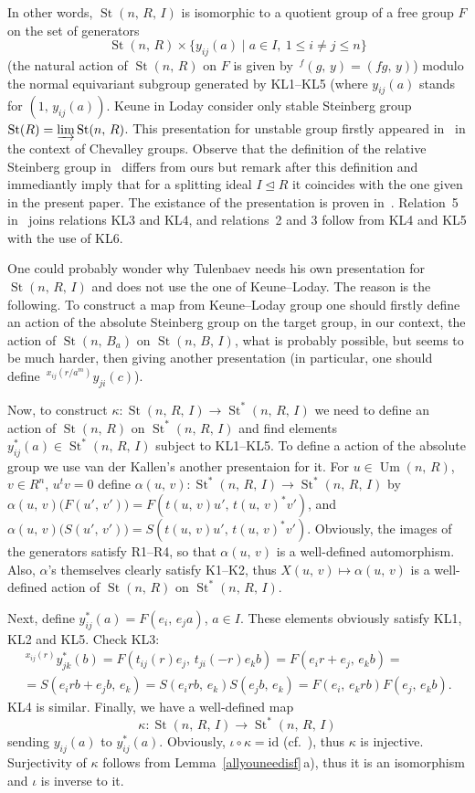 \documentclass[11pt]{amsart}
\theoremstyle{plain} \declaretheorem[name=Theorem, Refname={Theorem,Theorems}]{tm} \Crefname{tm}{Theorem}{Theorems}
\numberwithin{equation}{section}
\theoremstyle{definition} \newtheorem{df}[lm]{Definition} \Crefname{df}{Definition}{Definitions}
\theoremstyle{remark} \newtheorem{rk}[lm]{Remark} \Crefname{rk}{Remark}{Remarks}
\newcommand{\Um}{\mathop{\mathrm{Um}}\nolimits}
\newcommand{\St}{\mathop{\mathrm{St}}\nolimits}
\begin{document}
In other words, $\St(n,\,R,\,I)$ is isomorphic to a quotient group of a free group $F$ on the set of generators 
$$\St(n,\,R)\times\{y_{ij}(a)\mid a\in I,\ 1\leq i\neq j\leq n\}$$
(the natural action of $\St(n,\,R)$ on $F$ is given by $\!\,^f(g,\,y)=(fg,\,y)$) modulo the normal equivariant subgroup generated by KL1--KL5 (where $y_{ij}(a)$ stands for $(1,\,y_{ij}(a))$. Keune in Loday consider only stable Steinberg group $\St(R)=\varinjlim\St(n,\,R)$. This presentation for unstable group firstly appeared in~\cite{SCh} in the context of Chevalley groups. Observe that the definition of the relative Steinberg group in~\cite[Def.~3.3]{SCh} differs from ours but remark after this definition and~\cite[Lem.~8]{SCh} immediantly imply that for a splitting ideal $I\trianglelefteq R$ it coincides with the one given in the present paper. The existance of the presentation is proven in~\cite[Prop.~6]{SCh}. Relation~5 in~\cite[Prop.~6]{SCh} joins relations KL3 and KL4, and relations~2 and 3 follow from KL4 and KL5 with the use of KL6.

One could probably wonder why Tulenbaev needs his own presentation for $\St(n,\,R,\,I)$ and does not use the one of Keune--Loday. The reason is the following. To construct a map from Keune--Loday group one should firstly define an action of the absolute Steinberg group on the target group, in our context, the action of $\St(n,\,B_a)$ on $\St(n,\,B,\,I)$, what is probably possible, but seems to be much harder, then giving another presentation (in particular, one should define $\!\,^{x_{ij}(r/a^m)}y_{ji}(c)$).

Now, to construct
$
\kappa\colon\St(n,\,R,\,I)\rightarrow\St^*(n,\,R,\,I)
$
we need to define an action of $\St(n,\,R)$ on $\St^*(n,\,R,\,I)$ and find elements $y^*_{ij}(a)\in\St^*(n,\,R,\,I)$ subject to KL1--KL5. To define a action of the absolute group we use van der Kallen's another presentaion for it. For $u\in\Um(n,\,R)$, $v\in R^n$, $u^tv=0$ define
$
\alpha(u,\,v)\colon\St^*(n,\,R,\,I)\rightarrow\St^*(n,\,R,\,I)
$
by $\alpha(u,\,v)\big(F(u',\,v')\big)=F(t(u,\,v)u',\,t(u,\,v)^*v')$, and $\alpha(u,\,v)\big(S(u',\,v')\big)=S(t(u,\,v)u',\,t(u,\,v)^*v')$. Obviously, the images of the generators satisfy R1--R4, so that $\alpha(u,\,v)$ is a well-defined automorphism. Also, $\alpha$'s themselves clearly satisfy K1--K2, thus $X(u,\,v)\mapsto\alpha(u,\,v)$ is a well-defined action of $\St(n,\,R)$ on $\St^*(n,\,R,\,I)$.

Next, define $y_{ij}^*(a)=F(e_i,\,e_ja)$, $a\in I$. These elements obviously satisfy KL1, KL2 and KL5. Check KL3:
\begin{multline*}
\!\,^{x_{ij}(r)}y^*_{jk}(b)=F(t_{ij}(r)e_j,\,t_{ji}(-r)e_kb)=F(e_ir+e_j,\,e_kb)=\\
=S(e_irb+e_jb,\,e_k)=S(e_irb,\,e_k)S(e_jb,\,e_k)=F(e_i,\,e_krb)F(e_j,\,e_kb).
\end{multline*} 
KL4 is similar. Finally, we have a well-defined map
$$
\kappa\colon\St(n,\,R,\,I)\rightarrow\St^*(n,\,R,\,I)
$$
sending $y_{ij}(a)$ to $y^*_{ij}(a)$. Obviously, $\iota\circ\kappa=\mathrm{id}$ (cf.~\cite[3.6\,d)]{vdK}), thus $\kappa$ is injective. Surjectivity of $\kappa$ follows from Lemma~\ref{allyouneedisf}\,a), thus it is an isomorphism and $\iota$ is inverse to it.
\end{document}
